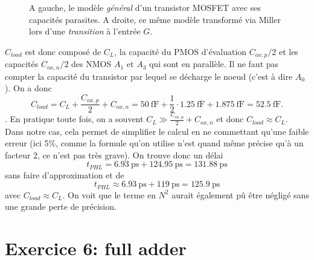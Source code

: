 \documentclass[frenchb,DIV=14]{scrartcl}
\begin{document}
\begin{figure}
	\centering
	\caption{A gauche, le modèle \emph{général} d'un transistor
	MOSFET avec ses capacités parasites. A droite, ce même modèle
	transformé via Miller lors d'une \emph{transition} à l'entrée $G$.}
	\label{fig:mos-model}
\end{figure}

$C_{load}$ est donc composé de $C_L$, la capacité
du PMOS d'évaluation $C_{ox,p}/2$ et les capacités $C_{ox,n}/2$ des NMOS
$A_1$ et $A_3$ qui sont en parallèle. Il ne faut pas compter la capacité
du transistor par lequel se décharge le noeud (c'est à dire $A_0$).
On a donc
\[ C_{load} = C_L + \frac{C_{ox,p}}{2} + C_{ox,n} = \SI{50}{\femto\farad}
+ \frac{1}{2}\cdot\SI{1.25}{\femto\farad} + \SI{1.875}{\femto\farad} = \SI{52.5}{\femto\farad}. \].
En pratique toute fois, on a souvent $C_L \gg \frac{C_{ox,p}}{2} + C_{ox,n}$
et donc $C_{load} \approx C_L$.  Dans notre cas, cela permet de simplifier
le calcul en ne commettant qu'une faible erreur (ici 5\%, comme
la formule qu'on utilise n'est quand même précise qu'à un facteur 2, ce n'est
pas très grave). On trouve donc un délai
\[ t_{PHL} = \SI{6.93}{\pico\second} + \SI{124.95}{\pico\second} =
\SI{131.88}{\pico\second} \]
sans faire d'approximation et de
\[ t_{PHL} \approx \SI{6.93}{\pico\second} + \SI{119}{\pico\second}
= \SI{125.9}{\pico\second} \]
avec $C_{load} \approx C_L$.
On voit que le terme en $N^2$ aurait également pû être négligé sans une grande
perte de précision.

\clearpage
\section*{Exercice 6: full adder}
\end{document}
